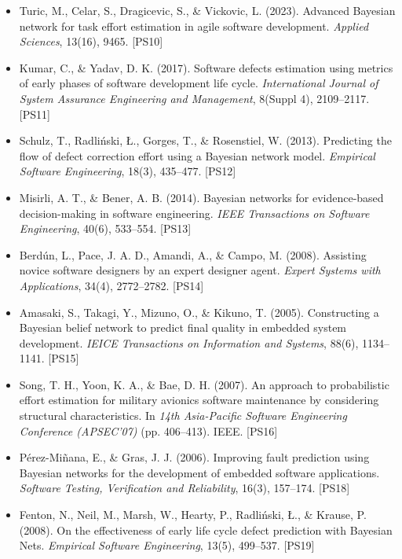 \begin{itemize}
\item Turic, M., Celar, S., Dragicevic, S., \& Vickovic, L. (2023).
Advanced Bayesian network for task effort estimation in agile software development.
\textit{Applied Sciences}, 13(16), 9465. [PS10]

\item Kumar, C., \& Yadav, D. K. (2017).
Software defects estimation using metrics of early phases of software development life cycle.
\textit{International Journal of System Assurance Engineering and Management}, 8(Suppl 4), 2109--2117. [PS11]

\item Schulz, T., Radliński, Ł., Gorges, T., \& Rosenstiel, W. (2013).
Predicting the flow of defect correction effort using a Bayesian network model.
\textit{Empirical Software Engineering}, 18(3), 435--477. [PS12]

\item Misirli, A. T., \& Bener, A. B. (2014).
Bayesian networks for evidence-based decision-making in software engineering.
\textit{IEEE Transactions on Software Engineering}, 40(6), 533--554. [PS13]

\item Berdún, L., Pace, J. A. D., Amandi, A., \& Campo, M. (2008).
Assisting novice software designers by an expert designer agent.
\textit{Expert Systems with Applications}, 34(4), 2772--2782. [PS14]

\item Amasaki, S., Takagi, Y., Mizuno, O., \& Kikuno, T. (2005).
Constructing a Bayesian belief network to predict final quality in embedded system development.
\textit{IEICE Transactions on Information and Systems}, 88(6), 1134--1141. [PS15]

\item Song, T. H., Yoon, K. A., \& Bae, D. H. (2007).
An approach to probabilistic effort estimation for military avionics software maintenance by considering structural characteristics.
In \textit{14th Asia-Pacific Software Engineering Conference (APSEC'07)} (pp. 406--413). IEEE. [PS16]

\item Pérez-Miñana, E., \& Gras, J. J. (2006).
Improving fault prediction using Bayesian networks for the development of embedded software applications.
\textit{Software Testing, Verification and Reliability}, 16(3), 157--174. [PS18]

\item Fenton, N., Neil, M., Marsh, W., Hearty, P., Radliński, Ł., \& Krause, P. (2008).
On the effectiveness of early life cycle defect prediction with Bayesian Nets.
\textit{Empirical Software Engineering}, 13(5), 499--537. [PS19]


\end{itemize}
